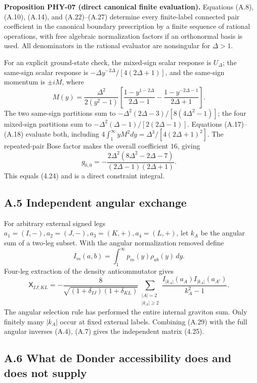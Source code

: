 \textbf{Proposition PHY-07 (direct canonical finite evaluation).} Equations (A.8), (A.10), (A.14), and (A.22)--(A.27) determine every finite-label connected pair coefficient in the canonical boundary prescription by a finite sequence of rational operations, with free algebraic normalization factors if an orthonormal basis is used. All denominators in the rational evaluator are nonsingular for \(\Delta>1\).

For an explicit ground-state check, the mixed-sign scalar response is \(U_\Delta\); the same-sign scalar response is \(-\Delta y^{-2\Delta}/[4(2\Delta+1)]\), and the same-sign momentum is \(\pm iM\), where \[
M(y)=\frac{\Delta^2}{2(y^2-1)}
\left[\frac{1-y^{1-2\Delta}}{2\Delta-1}
-\frac{1-y^{-2\Delta-1}}{2\Delta+1}\right].
\] The two same-sign partitions sum to \(-\Delta^2(2\Delta-3)/[8(4\Delta^2-1)]\); the four mixed-sign partitions sum to \(-\Delta^2(\Delta-1)/[2(2\Delta-1)]\). Equations (A.17)--(A.18) evaluate both, including \(4\int_1^\infty yM^2dy=\Delta^3/[4(2\Delta+1)^2]\). The repeated-pair Bose factor makes the overall coefficient \(16\), giving \[
g_{0,0}=-\frac{2\Delta^2(8\Delta^2-2\Delta-7)}
{(2\Delta-1)(2\Delta+1)}.
\tag{A.28}
\] This equals (4.24) and is a direct constraint integral.

\hypertarget{a.5-independent-angular-exchange}{%
\subsection{A.5 Independent angular exchange}\label{a.5-independent-angular-exchange}}

For arbitrary external signed legs \(a_1=(I,-),a_2=(J,-),a_3=(K,+),a_4=(L,+)\), let \(k_A\) be the angular sum of a two-leg subset. With the angular normalization removed define \[
I_m(a,b)=\int_1^\infty p_m(y)\rho_{ab}(y)\,dy .
\] Four-leg extraction of the density anticommutator gives \[
\boxed{
\mathsf X_{IJ;KL}
=-\frac8{\sqrt{(1+\delta_{IJ})(1+\delta_{KL})}}
\sum_{\substack{|A|=2\\|k_A|\ge2}}
\frac{I_{|k_A|}(a_A)I_{|k_A|}(a_{A^c})}{k_A^2-1}.
}
\tag{A.29}
\] The angular selection rule has performed the entire internal graviton sum. Only finitely many \(|k_A|\) occur at fixed external labels. Combining (A.29) with the full angular inverses (A.4), (A.7) gives the independent matrix (4.25).

\hypertarget{a.6-what-de-donder-accessibility-does-and-does-not-supply}{%
\subsection{A.6 What de Donder accessibility does and does not supply}\label{a.6-what-de-donder-accessibility-does-and-does-not-supply}}

